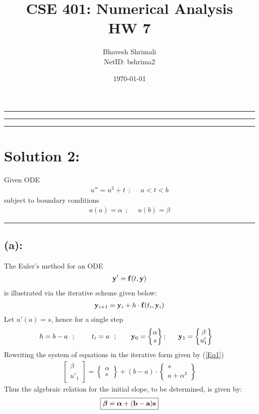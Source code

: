 
\title{\bf CSE 401: Numerical Analysis \\ HW 7}
\author{Bhavesh Shrimali \\ NetID: bshrima2}
\date{\today}
\titlespacing*{\title}{-2ex}{*-2ex}{-2ex}

\maketitle \hrule\hrule\hrule
\section*{Solution 2: }
Given ODE
\begin{align*}
u'' 
=
u^3 +t\ \ ; \ \ \ \ \ \ a<t<b
\end{align*}
subject to boundary conditions
\begin{align*}
u(a) = \alpha\ \ ; \ \ \ \ \ \ u(b) = \beta
\end{align*}\hrule
\subsection*{(a):}
The Euler's method for an ODE 
\begin{align*}
{\bf y}' = {\bf f}(t,{\bf y})
\end{align*}
is illustrated via the iterative scheme given below:
\begin{align}
{\bf y}_{i+1} 
=
{\bf y}_i
+ h\cdot{\bf f}(t_i,{\bf y}_i)
\label{Eq1}
\end{align}
Let $u'(a) = s$, hence for a single step 
\begin{align*}
& h=b-a\ \ ; \ \ \ \ \ \ \ t_i = a\ \ ; \ \ \ \ \ \  {\bf y}_0 = \begin{Bmatrix}\alpha\\s \end{Bmatrix}; \ \ \ \ \ {\bf y}_{1} = \begin{Bmatrix}\beta\\u'_{1} \end{Bmatrix}
\end{align*}
Rewriting the system of equations in the iterative form given by 
(\ref{Eq1})
\begin{align*}
\begin{bmatrix}
\beta\\u'_{1}
\end{bmatrix}
=
\begin{Bmatrix}
\alpha\\s
\end{Bmatrix}
+ (b-a)\cdot
\begin{Bmatrix}
s\\a+\alpha^3
\end{Bmatrix}
\end{align*}
Thus the algebraic relation for the initial slope, to be determined, is given by:  
\begin{align*}
\boxed{
 \bf {\bm\beta} = {\bm\alpha} + (b-a) s
}
\end{align*}
